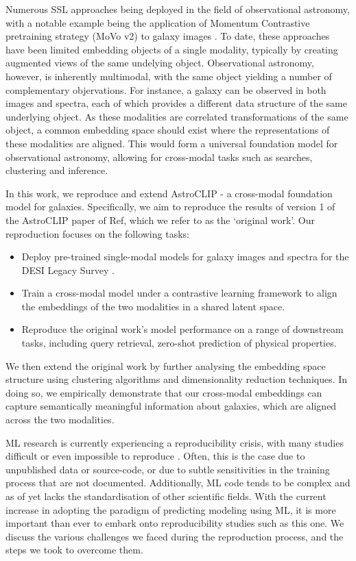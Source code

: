 \documentclass[draft, a4paper,12pt]{article}
\begin{document}
Numerous SSL approaches being deployed in the field of observational astronomy, with a notable example being the application of Momentum Contrastive pretraining strategy (MoVo v2) to galaxy images \cite{stein}. To date, these approaches have been limited embedding objects of a single modality, typically by creating augmented views of the same undelying object. Observational astronomy, however, is inherently multimodal, with the same object yielding a number of complementary objervations. For instance, a galaxy can be observed in both images and spectra, each of which provides a different data structure of the same underlying object. As these modalities are correlated transformations of the same object, a common embedding space should exist where the representations of these modalities are aligned. This would form a universal foundation model for observational astronomy, allowing for cross-modal tasks such as searches, clustering and inference.

In this work, we reproduce and extend AstroCLIP - a cross-modal foundation model for galaxies. Specifically, we aim to reproduce the results of version 1 of the AstroCLIP paper of Ref\cite{astroclip}, which we refer to as the `original work'. Our reproduction focuses on the following tasks:
\begin{itemize}
    \item Deploy pre-trained single-modal models for galaxy images and spectra for the DESI Legacy Survey \cite{DESI}.
    \item Train a cross-modal model under a contrastive learning framework to align the embeddings of the two modalities in a shared latent space.
    \item Reproduce the original work's model performance on a range of downstream tasks, including query retrieval, zero-shot prediction of physical properties.
\end{itemize}
We then extend the original work by further analysing the embedding space structure using clustering algorithms and dimensionality reduction techniques. In doing so, we empirically demonstrate that our cross-modal embeddings can capture semantically meaningful information about galaxies, which are aligned across the two modalities.

ML research is currently experiencing a reproducibility crisis, with many studies difficult or even impossible to reproduce \cite{kapoor2023leakage}. Often, this is the case due to unpublished data or source-code, or due to subtle sensitivities in the training process that are not documented. Additionally, ML code tends to be complex and as of yet lacks the standardisation of other scientific fields. With the current increase in adopting the paradigm of predicting modeling using ML, it is more important than ever to embark onto reproducibility studies such as this one. We discuss the various challenges we faced during the reproduction process, and the steps we took to overcome them. %
\end{document}
